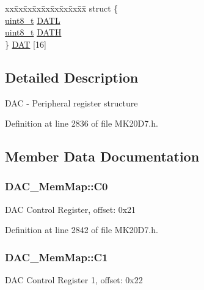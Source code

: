 \begin{DoxyCompactItemize}
\begin{tabbing}
\end{tabbing}\item 
\begin{tabbing}
xx\=xx\=xx\=xx\=xx\=xx\=xx\=xx\=xx\=\kill
struct \{\\
\>\hyperlink{_p_e___types_8h_aba7bc1797add20fe3efdf37ced1182c5}{uint8\_t} \hyperlink{struct_d_a_c___mem_map_a5e154a0937bc5d4879efb1fd80f713f0}{DATL}\\
\>\hyperlink{_p_e___types_8h_aba7bc1797add20fe3efdf37ced1182c5}{uint8\_t} \hyperlink{struct_d_a_c___mem_map_ab05302bfcc5f26e258870c56bbdb52b8}{DATH}\\
\} \hyperlink{struct_d_a_c___mem_map_a3e6f2f500e67b2b01e2a551dbcdd0497}{DAT} \mbox{[}16\mbox{]}\\

\end{tabbing}\end{DoxyCompactItemize}


\subsection{Detailed Description}
D\+AC -\/ Peripheral register structure 

Definition at line 2836 of file M\+K20\+D7.\+h.



\subsection{Member Data Documentation}
\subsubsection[{\texorpdfstring{C0}{C0}}]{ D\+A\+C\+\_\+\+Mem\+Map\+::\+C0}\hypertarget{struct_d_a_c___mem_map_a101597fee641d461b61f0c02c90ef703}{}\label{struct_d_a_c___mem_map_a101597fee641d461b61f0c02c90ef703}
D\+AC Control Register, offset\+: 0x21 

Definition at line 2842 of file M\+K20\+D7.\+h.

\subsubsection[{\texorpdfstring{C1}{C1}}]{ D\+A\+C\+\_\+\+Mem\+Map\+::\+C1}\hypertarget{struct_d_a_c___mem_map_a29c8fe336000ac0b40c05c444be3bc1b}{}\label{struct_d_a_c___mem_map_a29c8fe336000ac0b40c05c444be3bc1b}
D\+AC Control Register 1, offset\+: 0x22 

